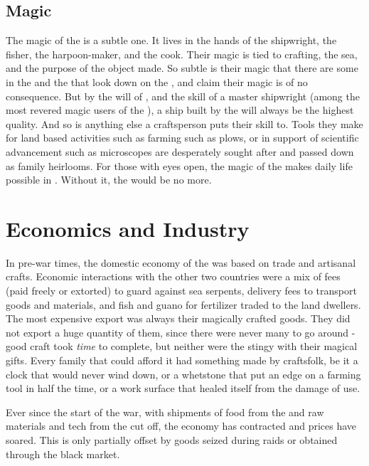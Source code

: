 \documentclass[blue]{GL2020}
\begin{document}
\subsection*{Magic}
The magic of the \pShip{} is a subtle one. It lives in the hands of the shipwright, the fisher, the harpoon-maker, and the cook. Their magic is tied to crafting, the sea, and the purpose of the object made. So subtle is their magic that there are some in the \pFarm{} and the \pTech{} that look down on the \pShippies{}, and claim their magic is of no consequence. But by the will of \cEbb{\full}, and the skill of a master shipwright (among the most revered magic users of the \pShippies{}), a ship built by the \pShippies{} will always be the highest quality. And so is anything else a \pShippie{} craftsperson puts their skill to. Tools they make for land based activities such as farming such as plows, or in support of scientific advancement such as microscopes are desperately sought after and passed down as family heirlooms. For those with eyes open, the magic of the \pShippies{} makes daily life possible in \pEarth{}. Without it, the \pShippies{} would be no more.

\section*{Economics and Industry}
In pre-war times, the domestic economy of the \pShip{} was based on trade and artisanal crafts. Economic interactions with the other two countries were a mix of fees (paid freely or extorted) to guard against sea serpents, delivery fees to transport goods and materials, and fish and guano for fertilizer traded to the land dwellers. The \pShippies{} most expensive export was always their magically crafted goods. They did not export a huge quantity of them, since there were never many to go around - good craft took \emph{time} to complete, but neither were the \pShippies{} stingy with their magical gifts. Every family that could afford it had something made by \pShippie{} craftsfolk, be it a clock that would never wind down, or a whetstone that put an edge on a farming tool in half the time, or a work surface that healed itself from the damage of use.

Ever since the start of the war, with shipments of food from the \pFarm{} and raw materials and tech from the \pTech{} cut off, the \pShippie{} economy has contracted and prices have soared. This is only partially offset by goods seized during raids or obtained through the black market.
\end{document}
